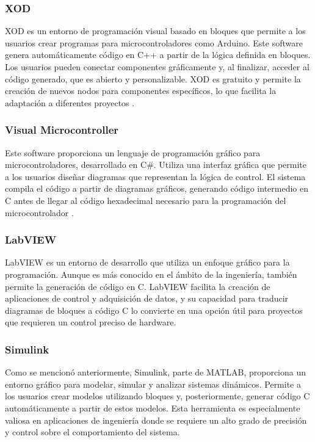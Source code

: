 \subsubsection{XOD}

XOD es un entorno de programación visual basado en bloques que permite a los usuarios crear programas para microcontroladores como Arduino. Este software 
genera automáticamente código en C++ a partir de la lógica definida en bloques. Los usuarios pueden conectar componentes gráficamente y, al finalizar, acceder 
al código generado, que es abierto y personalizable. XOD es gratuito y permite la creación de nuevos nodos para componentes específicos, lo que facilita la 
adaptación a diferentes proyectos \cite{Snchez2020ProgramacinDL}.

\subsubsection{Visual Microcontroller}
Este software proporciona un lenguaje de programación gráfico para microcontroladores, desarrollado en C\#. Utiliza una interfaz gráfica que permite a los 
usuarios diseñar diagramas que representan la lógica de control. El sistema compila el código a partir de diagramas gráficos, generando código intermedio 
en C antes de llegar al código hexadecimal necesario para la programación del microcontrolador \cite{Sacta2011DesarrolloDU}.


\subsubsection{LabVIEW}

LabVIEW es un entorno de desarrollo que utiliza un enfoque gráfico para la programación. Aunque es más conocido en el ámbito de la ingeniería, también 
permite la generación de código en C. LabVIEW facilita la creación de aplicaciones de control y adquisición de datos, y su capacidad para traducir 
diagramas de bloques a código C lo convierte en una opción útil para proyectos que requieren un control preciso de hardware.

\subsubsection{Simulink}
Como se mencionó anteriormente, Simulink, parte de MATLAB, proporciona un entorno gráfico para modelar, simular y analizar sistemas dinámicos. 
Permite a los usuarios crear modelos utilizando bloques y, posteriormente, generar código C automáticamente a partir de estos modelos. Esta 
herramienta es especialmente valiosa en aplicaciones de ingeniería donde se requiere un alto grado de precisión y control sobre el 
comportamiento del sistema.


